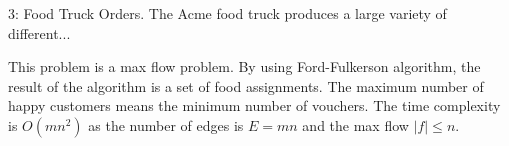 \begin{problem}{3: Food Truck Orders.} The Acme food truck produces a large variety of different...
\end{problem}
\begin{sol}
This problem is a max flow problem. By using Ford-Fulkerson algorithm, the result of the algorithm is a set of food assignments. The maximum number of happy customers means the minimum number of vouchers. The time complexity is $O(mn^2)$ as the number of edges is $E=mn$ and the max flow $|f|\leq n$.
\end{sol}